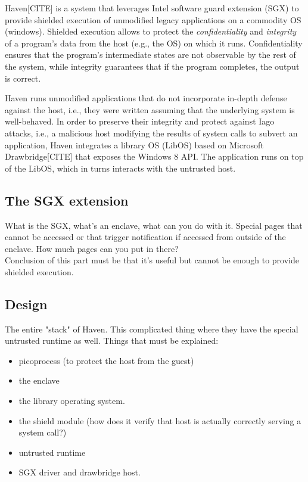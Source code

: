 Haven[CITE] is a system that leverages Intel software guard extension (SGX) to provide shielded execution of unmodified legacy applications on a commodity OS (windows).
Shielded execution allows to protect the \emph{confidentiality} and \emph{integrity} of a program's data from the host (e.g., the OS) on which it runs.
Confidentiality ensures that the program's intermediate states are not observable by the rest of the system, while integrity guarantees that if the program completes, the output is correct.

Haven runs unmodified applications that do not incorporate in-depth defense against the host, i.e., they were written assuming that the underlying system is well-behaved.
In order to preserve their integrity and protect against Iago attacks, i.e., a malicious host modifying the results of system calls to subvert an application, Haven integrates a library OS (LibOS) based on Microsoft Drawbridge[CITE] that exposes the Windows 8 API.
The application runs on top of the LibOS, which in turns interacts with the untrusted host.


\subsection{The SGX extension}
What is the SGX, what's an enclave, what can you do with it.
Special pages that cannot be accessed or that trigger notification if accessed from outside of the enclave.
How much pages can you put in there?\\

Conclusion of this part must be that it's useful but cannot be enough to provide shielded execution.

\subsection{Design}
The entire "stack" of Haven.
This complicated thing where they have the special untrusted runtime as well.
Things that must be explained:
\begin{itemize}
	\item picoprocess (to protect the host from the guest)
	\item the enclave
	\item the library operating system.
	\item the shield module (how does it verify that host is actually correctly serving a system call?)
	\item untrusted runtime
	\item SGX driver and drawbridge host.
\end{itemize}

